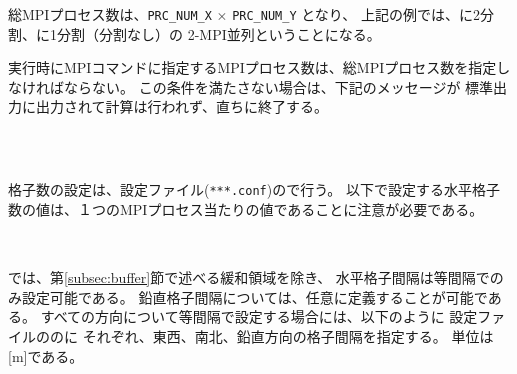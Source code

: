 総MPIプロセス数は、\verb|PRC_NUM_X| $\times$ \verb|PRC_NUM_Y|  となり、
上記の例では、\XDIR に2分割、\YDIR に1分割（分割なし）の 2-MPI並列ということになる。

実行時にMPIコマンドに指定するMPIプロセス数は、総MPIプロセス数を指定しなければならない。
この条件を満たさない場合は、下記のメッセージが
標準出力に出力されて計算は行われず、直ちに終了する。

\\





\subsection{\SubsecGridNumSettng} \label{subsec:relation_dom_reso3}

格子数の設定は、設定ファイル(\verb|***.conf|)ので行う。
以下で設定する水平格子数の値は、１つのMPIプロセス当たりの値であることに注意が必要である。\\

\\



\subsection{\SubsecGridIntvSettng} \label{subsec:gridinterv}
\scalerm では、第\ref{subsec:buffer}節で述べる緩和領域を除き、
水平格子間隔は等間隔でのみ設定可能である。
鉛直格子間隔については、任意に定義することが可能である。
すべての方向について等間隔で設定する場合には、以下のように
設定ファイルののに
それぞれ、東西、南北、鉛直方向の格子間隔を指定する。
単位は[m]である。\\

